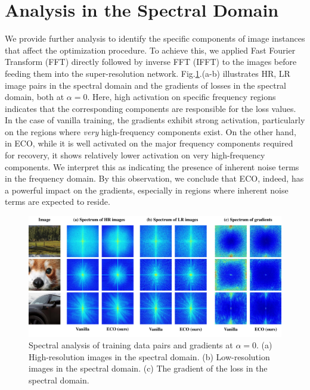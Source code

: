 \section{Analysis in the Spectral Domain\hfill\phantom{PLACEHOLDER}} \label{par:gradient_in_spectral_domain}

We provide further analysis to identify the specific components of image instances that affect the optimization procedure. To achieve this, we applied Fast Fourier Transform (FFT) directly followed by inverse FFT (IFFT) to the images before feeding them into the super-resolution network.
%
Fig.\ref{fig:high_frequency_gradient}.(a-b) illustrates HR, LR image pairs in the spectral domain and the gradients of losses in the spectral domain, both at $\alpha=0$.
%
Here, high activation on specific frequency regions indicates that the corresponding components are responsible for the loss values.
%
%
In the case of vanilla training, the gradients exhibit strong activation, particularly on the regions where \textit{very} high-frequency components exist. On the other hand, in ECO, while it is well activated on the major frequency components required for recovery, it shows relatively lower activation on very high-frequency components.
%
We interpret this as indicating the presence of inherent noise terms in the frequency domain.
%
%
By this observation, we conclude that ECO, indeed, has a powerful impact on the gradients, especially in regions where inherent noise terms are expected to reside.




\begin{figure}[h]
    \begin{center}
    \includegraphics[width=\textwidth]{figures/high_frequency_gradient.pdf}
    \end{center}
    \vspace{-10pt}
    \caption{Spectral analysis of training data pairs and gradients at $\alpha=0$. (a) High-resolution images in the spectral domain. (b) Low-resolution images in the spectral domain. (c) The gradient of the loss in the spectral domain.}
    \label{fig:high_frequency_gradient}
\end{figure}






